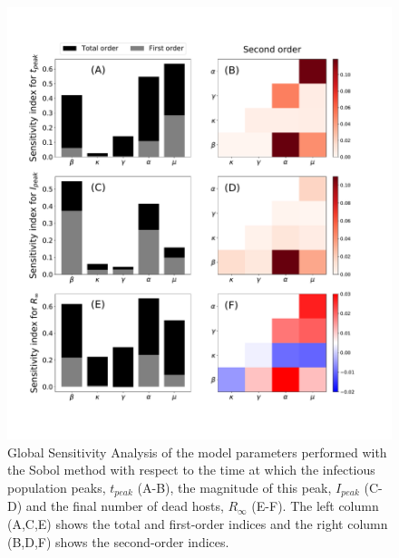 \begin{figure}[H]
    \centering
    \includegraphics[width=\textwidth]{Figures/GSA.pdf}
    \caption{Global Sensitivity Analysis of the model parameters performed
        with the Sobol method with respect to the time at which the infectious
        population peaks, $t_{peak}$ (A-B), the magnitude of this peak,
        $I_{peak}$
        (C-D) and the final number of dead hosts, $R_{\infty}$ (E-F). The left
        column
        (A,C,E) shows the total and first-order indices and the right column
        (B,D,F)
        shows the second-order indices.}
    \label{fig:GSA}
\end{figure}

